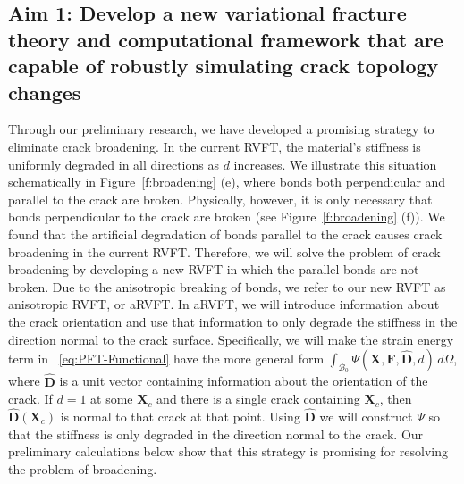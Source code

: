 \documentclass[10pt,letterpaper]{article}
\newcommand{\bs}[1]{\ensuremath{\boldsymbol{#1}}}
\begin{document}
  \subsection{Aim 1: Develop a new variational fracture theory and computational framework that are capable of robustly simulating crack topology changes}
   \label{s:A1}

   Through our preliminary research, we have developed a promising strategy to eliminate crack broadening.  In the current RVFT, the material's stiffness is uniformly degraded in all directions as $d$ increases. We illustrate this situation schematically in Figure~\ref{f:broadening} (e), where bonds both perpendicular and parallel to the crack are broken. Physically, however, it is only necessary that bonds perpendicular to the crack are broken (see Figure~\ref{f:broadening} (f)). We found that the artificial degradation of bonds parallel to the crack causes crack broadening in the current RVFT. Therefore, we will solve the problem of crack broadening by developing a new RVFT in which the parallel bonds are not broken. Due to the anisotropic breaking of bonds, we refer to our new RVFT as anisotropic RVFT, or aRVFT. In aRVFT, we will introduce information about the crack orientation and use that information to only degrade the stiffness in the direction normal to the crack surface. Specifically, we will make the strain energy term in ~\eqref{eq:PFT-Functional} have the more general form $\int_{\mathcal{B}_0}\mathsf{\Psi}(\bs{X}, \bs{F},\hat{\bs{D}},d)\, d\Omega$, where $\hat{\bs{D}}$ is a unit vector containing information about the orientation of the crack. If $d=1$ at some $\bs{X}_c$ and there is a single crack containing $\bs{X}_c$, then $\hat{\bs{D}}(\bs{X}_c)$ is normal to that crack at that point. Using $\hat{\bs{D}}$ we will construct $\mathsf{\Psi}$ so that the stiffness is only degraded in the direction normal to the crack. Our preliminary calculations below show that this strategy is promising for resolving the problem of broadening.
\end{document}
